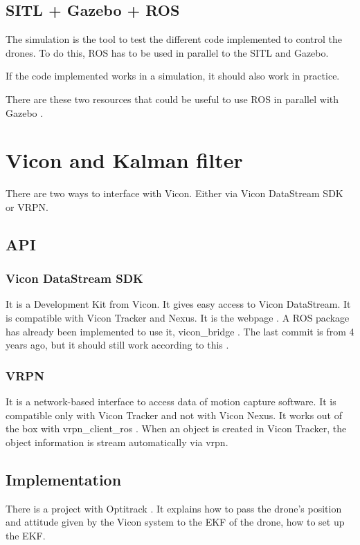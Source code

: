 \subsection{SITL + Gazebo + ROS}
The simulation is the tool to test the different code implemented to control the drones.
To do this, ROS has to be used in parallel to the SITL and Gazebo.

If the code implemented works in a simulation, it should also work in practice.

There are these two resources that could be useful to use ROS in parallel with Gazebo\cite{youtube_gazebo_ros} \cite{github_gazebo_ros}.



\section{Vicon and Kalman filter}
There are two ways to interface with Vicon. Either via Vicon DataStream SDK or VRPN.

\subsection{API}
\subsubsection{Vicon DataStream SDK}
It is a Development Kit from Vicon. It gives easy access to Vicon DataStream. It is compatible with Vicon Tracker and Nexus. It is the webpage \cite{vicon_sdk}. A ROS package has already been implemented to use it, vicon\_bridge \cite{github_vicon_bridge}.
The last commit is from 4 years ago, but it should still work according to this \cite{ros_packages_for_vicon}.

\subsubsection{VRPN}
It is a network-based interface to access data of motion capture software. It is compatible only with Vicon Tracker and not with Vicon Nexus. It works out of the box with vrpn\_client\_ros \cite{ros_vrpn_client_ros}. When an object is created in Vicon Tracker, the object information is stream automatically via vrpn.

\subsection{Implementation}
There is a project with Optitrack \cite{ardupilot_optitrack}. It explains how to pass the drone's position and attitude given by the Vicon system to the EKF of the drone, how to set up the EKF.

